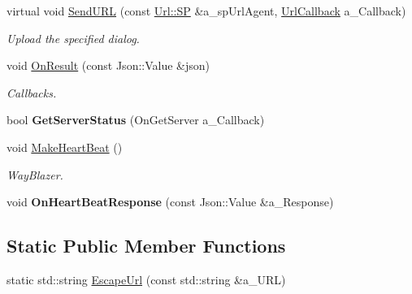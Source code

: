 \begin{DoxyCompactItemize}
virtual void \hyperlink{class_u_r_l_service_ab15f5c5f61f7754abf0718ba1fcc7020}{Send\+U\+RL} (const \hyperlink{class_url_aaca644501980743f3446d0d7a31565be}{Url\+::\+SP} \&a\+\_\+sp\+Url\+Agent, \hyperlink{class_u_r_l_service_a0459fed277e6b3e9f933e89f06b05e18}{Url\+Callback} a\+\_\+\+Callback)
\begin{DoxyCompactList}\small\item\em Upload the specified dialog. \end{DoxyCompactList}\item 
\mbox{\label{class_u_r_l_service_a36adf254a0097ec9708de865ef7feddb}} 
void \hyperlink{class_u_r_l_service_a36adf254a0097ec9708de865ef7feddb}{On\+Result} (const Json\+::\+Value \&json)
\begin{DoxyCompactList}\small\item\em Callbacks. \end{DoxyCompactList}\item 
\mbox{\label{class_u_r_l_service_aa11ad208e95b7c72858caf1da254940e}} 
bool {\bfseries Get\+Server\+Status} (On\+Get\+Server a\+\_\+\+Callback)
\item 
\mbox{\label{class_u_r_l_service_a640ad1b9b173b72818ffee1fae352437}} 
void \hyperlink{class_u_r_l_service_a640ad1b9b173b72818ffee1fae352437}{Make\+Heart\+Beat} ()
\begin{DoxyCompactList}\small\item\em Way\+Blazer. \end{DoxyCompactList}\item 
\mbox{\label{class_u_r_l_service_aa6d442922e8750237db6bca03297f88a}} 
void {\bfseries On\+Heart\+Beat\+Response} (const Json\+::\+Value \&a\+\_\+\+Response)
\end{DoxyCompactItemize}
\subsection*{Static Public Member Functions}
\begin{DoxyCompactItemize}
\item 
static std\+::string \hyperlink{class_u_r_l_service_ac2ce83dbbbe8452d8952f82efd4f88bb}{Escape\+Url} (const std\+::string \&a\+\_\+\+U\+RL)
\end{DoxyCompactItemize}
